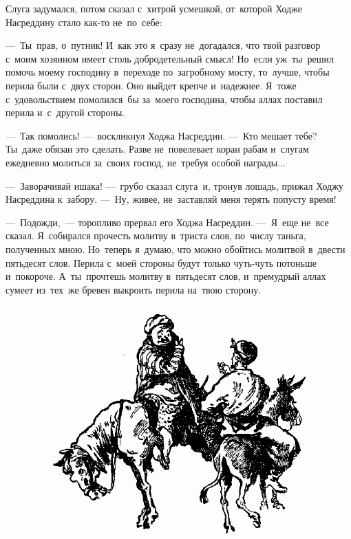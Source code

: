 \documentclass[12pt,a4paper]{book}
\begin{document}
Слуга задумался, потом сказал с~хитрой усмешкой, от~которой Ходже Насреддину стало как-то не~по~себе:

—~Ты~прав, о~путник! И~как это я~сразу не~догадался, что твой разговор с~моим хозяином имеет столь добродетельный смысл! Но~если уж~ты~решил помочь моему господину в~переходе по~загробному мосту, то~лучше, чтобы перила были с~двух сторон. Оно выйдет крепче и~надежнее. Я~тоже с~удовольствием помолился~бы за~моего господина, чтобы аллах поставил перила и~с~другой стороны.

—~Так помолись! —~воскликнул Ходжа Насреддин. —~Кто мешает тебе? Ты~даже обязан это сделать. Разве не~повелевает коран рабам и~слугам ежедневно молиться за~своих господ, не~требуя особой награды...

—~Заворачивай ишака! —~грубо сказал слуга~и, тронув лошадь, прижал Ходжу Насреддина к~забору. —~Ну, живее, не~заставляй меня терять попусту время!

—~Подожди,~— торопливо прервал его Ходжа Насреддин. —~Я~еще не~все сказал. Я~собирался прочесть молитву в~триста слов, по~числу таньга, полученных мною. Но~теперь я~думаю, что можно обойтись молитвой в~двести пятьдесят слов. Перила с~моей стороны будут только чуть-чуть потоньше и~покороче. А~ты~прочтешь молитву в~пятьдесят слов, и~премудрый аллах сумеет из~тех~же бревен выкроить перила на~твою сторону.

\begin{figure}[h]
\centering
\includegraphics[width=\textwidth]{2.png}
\end{figure}
\end{document}
